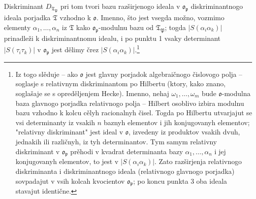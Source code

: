 \documentclass[11pt]{article}
\newcommand{\mo}{\mathfrak{o}}
\newcommand{\mT}{\mathfrak{T}}
\newcommand{\mP}{\mathfrak{P}}
\newcommand{\mpideal}{\mathfrak{p}}
\begin{document}
\setcounter{footnote}{38}

\noindent Diskriminant $D_{\mT_\mP}$ pri tom tvori bazu razširjenogo ideala v $\mo_\mpideal$ diskriminantnogo ideala porjadka $\mT$ vzhodno k $\mo$. Imenno, što jest vsegda možno, vozmimo elementy $\alpha_1,\ldots,\alpha_n$ iz $\mT$ kako $\mo_\mpideal$-modulnu bazu od $\mT_\mP$; togda $|S(\alpha_i\alpha_k)|$ prinadleži k diskriminantnomu idealu, i po punktu 1 vsaky determinant $|S(\tau_i\tau_k)|$ v $\mo_\mpideal$ jest dělimy črez $|S(\alpha_i\alpha_k)|$.\footnote{Iz togo slěduje -- ako $\mo$ jest glavny porjadok algebraičnogo čislovogo polja -- soglasje s relativnym diskriminantom po Hilbertu (ktory, kako znano, soglašaje se s opreděljenjem Hecke). Imenno, nehaj $\omega_1,\ldots,\omega_m$ bude $\mo$-modulna baza glavnogo porjadka relativnogo polja -- Hilbert osoblivo izbira modulnu bazu vzhodno k kolcu cělyh racionalnyh čisel. Togda po Hilbertu utvarjajut se vsi determinanty iz vsakih $n$ baznyh elementov i jih konjugovanyh elementov; "relativny diskriminant" jest ideal v $\mo$, izvedeny iz produktov vsakih dvuh, jednakih ili različnyh, iz tyh determinantov. Tym samym relativny diskriminant v $\mo_\mpideal$ prěhodi v kvadrat determinanta bazy $\alpha_1,\ldots,\alpha_n$ i jej konjugovanyh elementov, to jest v $|S(\alpha_i\alpha_k)|$. Zato razširjenja relativnogo diskriminanta i diskriminantnogo ideala (relativnogo glavnogo porjadka) sovpadajut v vsih kolcah kvocientov $\mo_\mpideal$; po koncu punkta 3 oba ideala stavajut identične.}
\end{document}
